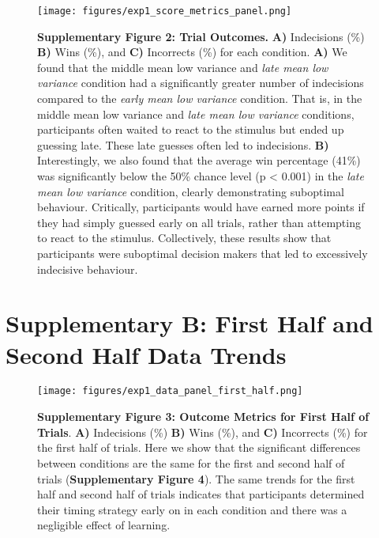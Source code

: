 \documentclass[12pt]{article}
\newcommand\boldblue[1]{\textcolor{mydarkblue}{\textbf{#1}}}
\begin{document}
\begin{figure}[H]
    \centering
    \texttt{[image: figures/exp1\_score\_metrics\_panel.png]}

    \caption*{\boldblue{Supplementary Figure 2: Trial Outcomes.} \boldblue{A)} Indecisions (\%) \boldblue{B)} Wins (\%), and \boldblue{C)} Incorrects (\%) for each condition. \boldblue{A)} We found that the middle mean low variance and \emph{late mean low variance} condition had a significantly greater number of indecisions compared to the \emph{early mean low variance} condition. That is, in the middle mean low variance and \emph{late mean low variance} conditions, participants often waited to react to the stimulus but ended up guessing late. These late guesses often led to indecisions. \boldblue{B)} Interestingly, we also found that the average win percentage (41\%) was significantly below the 50\% chance level (p < 0.001) in the \emph{late mean low variance} condition, clearly demonstrating suboptimal behaviour. Critically, participants would have earned more points if they had simply guessed early on all trials, rather than attempting to react to the stimulus. Collectively, these results show that participants were suboptimal decision makers that led to excessively indecisive behaviour.}
\end{figure}

\newpage
\section{Supplementary B: First Half and Second Half Data Trends}
\vspace{-1mm}

\begin{figure}[H]
    \centering
    \texttt{[image: figures/exp1\_data\_panel\_first\_half.png]}
    \caption*{
        \boldblue{Supplementary Figure 3: Outcome Metrics for First Half of Trials}. \boldblue{A)} Indecisions (\%) \boldblue{B)} Wins (\%), and \boldblue{C)} Incorrects (\%) for the first half of trials. 
        Here we show that the significant differences between conditions are the same for the first and second half of trials (\boldblue{Supplementary Figure 4}).         
        The same trends for the first half and second half of trials indicates that participants determined their timing strategy early on in each condition and there was a negligible effect of learning. 
    } 
\end{figure}
\end{document}

